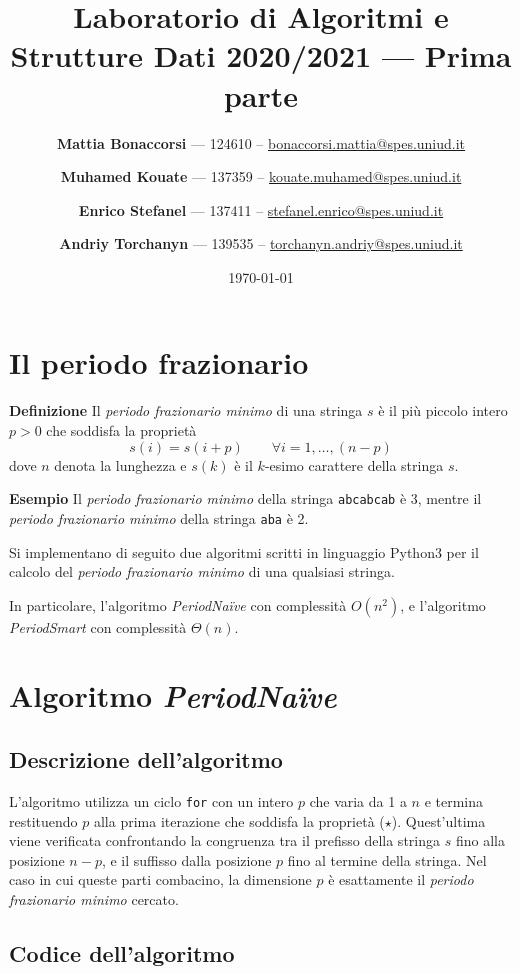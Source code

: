 \documentclass[11pt,a4paper,italian]{article}
\title{\textbf{Laboratorio di Algoritmi e Strutture Dati 2020/2021} --- Prima parte}
\date{\today}
\author{\textbf{Mattia Bonaccorsi} --- 124610 -- \href{mailto:bonaccorsi.mattia@spes.uniud.it}{bonaccorsi.mattia@spes.uniud.it}
   \and \textbf{Muhamed Kouate} --- 137359 -- \href{mailto:kouate.muhamed@spes.uniud.it}{kouate.muhamed@spes.uniud.it}
   \and \textbf{Enrico Stefanel} --- 137411 -- \href{mailto:stefanel.enrico@spes.uniud.it}{stefanel.enrico@spes.uniud.it}
   \and \textbf{Andriy Torchanyn} --- 139535 -- \href{mailto:torchanyn.andriy@spes.uniud.it}{torchanyn.andriy@spes.uniud.it}
   }
\begin{document}
\maketitle
\tableofcontents


\clearpage

\section{Il periodo frazionario}
\textbf{Definizione} Il \textit{periodo frazionario minimo} di una stringa $s$ è il più piccolo intero $p>0$ che soddisfa la proprietà
\begin{equation}
s(i) = s(i+p)\qquad \forall i = 1, \dots , (n-p) \tag{$\star$}
\end{equation}
dove $n$ denota la lunghezza e $s(k)$ \`e il $k$-esimo carattere della stringa $s$.

\textbf{Esempio} Il \emph{periodo frazionario minimo} della stringa \texttt{abcabcab} è 3, mentre il \emph{periodo frazionario minimo} della stringa \texttt{aba} è 2.

Si implementano di seguito due algoritmi scritti in linguaggio Python3 per il calcolo del \emph{periodo frazionario minimo} di una qualsiasi stringa.

In particolare, l'algoritmo \textit{PeriodNa{\"i}ve} con complessità $O(n^2)$, e l'algoritmo \textit{PeriodSmart} con complessità $\Theta(n)$.


\section{Algoritmo \textit{PeriodNa{\"i}ve}}

\subsection{Descrizione dell'algoritmo}
L'algoritmo utilizza un ciclo \texttt{for}  con un intero $p$ che varia da 1 a $n$ e termina restituendo $p$ alla prima iterazione che soddisfa la proprietà ($\star$). Quest'ultima viene verificata confrontando la congruenza tra il prefisso della stringa $s$ fino alla posizione $n-p$, e il suffisso dalla posizione $p$ fino al termine della stringa. Nel caso in cui queste parti combacino, la dimensione $p$ è esattamente il \textit{periodo frazionario minimo} cercato.

\subsection{Codice dell'algoritmo}  
 
\end{document}
